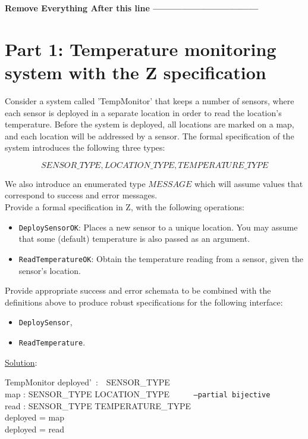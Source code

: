 \documentclass[12pt]{article}
\begin{document}
\textbf{Remove Everything After this line ---------------------------------}\\
\newpage

\section*{Part 1:  Temperature monitoring system with the Z specification}

Consider a system called 'TempMonitor' that keeps a number of sensors, where each sensor is deployed in a separate location in order to read the location's temperature. Before the system is deployed, all locations are marked on a map, and each location will be addressed by a sensor. The formal specification of the system introduces the following three types:

\[ SENSOR\_TYPE,  LOCATION\_TYPE, TEMPERATURE\_TYPE  \]

\noindent We also introduce an enumerated type $MESSAGE$ which will assume values that correspond to success and error messages.\\

\noindent Provide a formal specification in Z, with the following operations:

\begin{itemize}
	\item \texttt{DeploySensorOK}:  Places a new sensor to a unique location. You may assume that some (default) temperature is also passed as an argument.
	\item \texttt{ReadTemperatureOK}: Obtain the temperature reading from a sensor, given the sensor's location.
\end{itemize}

\noindent Provide appropriate success and error schemata to be combined with the definitions above to produce robust specifications for the following interface:

\begin{itemize}
	\item \texttt{DeploySensor},
	\item \texttt{ReadTemperature}.
\end{itemize}

\newpage

\noindent \underline{Solution}:

\begin{schema}{TempMonitor}
deployed'~:~~SENSOR\_TYPE\\
map : SENSOR\_TYPE \nrightarrow LOCATION\_TYPE \texttt{~~~~~--partial bijective}\\
read : SENSOR\_TYPE  \nrightarrow TEMPERATURE\_TYPE\\
\where
deployed = \dom map\\
deployed = \dom read
\end{schema}
\end{document}
